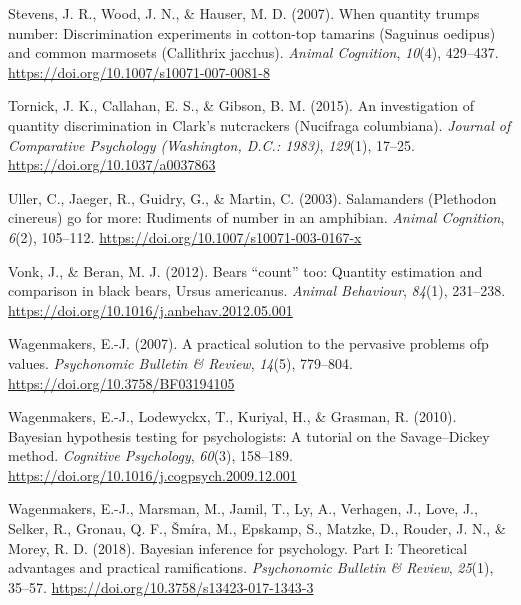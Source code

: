 \documentclass[
  ,pub,floatsintext]{apa6}
\newlength{\cslhangindent}
\newlength{\cslentryspacingunit} %
\newenvironment{CSLReferences}[2] %
 {%
  \setlength{\parindent}{0pt}
  \ifodd #1
  \let\oldpar\par
  \def\par{\hangindent=\cslhangindent\oldpar}
  \fi
  \setlength{\parskip}{#2\cslentryspacingunit}
 }%
 {}
\begin{document}
\begin{CSLReferences}{1}{0}
\leavevmode{}%
Stevens, J. R., Wood, J. N., \& Hauser, M. D. (2007). When quantity trumps number: Discrimination experiments in cotton-top tamarins ({Saguinus} oedipus) and common marmosets ({Callithrix} jacchus). \emph{Animal Cognition}, \emph{10}(4), 429--437. \url{https://doi.org/10.1007/s10071-007-0081-8}

\leavevmode{}%
Tornick, J. K., Callahan, E. S., \& Gibson, B. M. (2015). An investigation of quantity discrimination in {Clark}'s nutcrackers ({Nucifraga} columbiana). \emph{Journal of Comparative Psychology (Washington, D.C.: 1983)}, \emph{129}(1), 17--25. \url{https://doi.org/10.1037/a0037863}

\leavevmode{}%
Uller, C., Jaeger, R., Guidry, G., \& Martin, C. (2003). Salamanders ({Plethodon} cinereus) go for more: Rudiments of number in an amphibian. \emph{Animal Cognition}, \emph{6}(2), 105--112. \url{https://doi.org/10.1007/s10071-003-0167-x}

\leavevmode{}%
Vonk, J., \& Beran, M. J. (2012). Bears {``count''} too: Quantity estimation and comparison in black bears, {Ursus} americanus. \emph{Animal Behaviour}, \emph{84}(1), 231--238. \url{https://doi.org/10.1016/j.anbehav.2012.05.001}

\leavevmode{}%
Wagenmakers, E.-J. (2007). A practical solution to the pervasive problems ofp values. \emph{Psychonomic Bulletin \& Review}, \emph{14}(5), 779--804. \url{https://doi.org/10.3758/BF03194105}

\leavevmode{}%
Wagenmakers, E.-J., Lodewyckx, T., Kuriyal, H., \& Grasman, R. (2010). Bayesian hypothesis testing for psychologists: {A} tutorial on the {Savage}--{Dickey} method. \emph{Cognitive Psychology}, \emph{60}(3), 158--189. \url{https://doi.org/10.1016/j.cogpsych.2009.12.001}

\leavevmode{}%
Wagenmakers, E.-J., Marsman, M., Jamil, T., Ly, A., Verhagen, J., Love, J., Selker, R., Gronau, Q. F., Šmíra, M., Epskamp, S., Matzke, D., Rouder, J. N., \& Morey, R. D. (2018). Bayesian inference for psychology. {Part I}: {Theoretical} advantages and practical ramifications. \emph{Psychonomic Bulletin \& Review}, \emph{25}(1), 35--57. \url{https://doi.org/10.3758/s13423-017-1343-3}


\end{CSLReferences}
\end{document}
